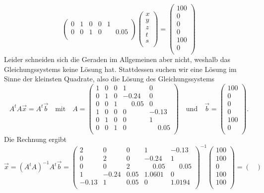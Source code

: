 \begin{loesung}
\[\begin{pmatrix}
0&1&0& 0 & 1\\
0&0&1& 0 & \phantom{-}0.05\\
\end{pmatrix}
\begin{pmatrix}
x\\y\\z\\ t\\s\\ 
\end{pmatrix}
= 
\begin{pmatrix}
100\\
0\\
0\\
0\\
100\\
0\\
\end{pmatrix}
\]
Leider schneiden sich die Geraden im Allgemeinen aber nicht,
weshalb das Gleichungssystems keine Lösung hat. Stattdessen
suchen wir eine Lösung im Sinne der kleinsten Quadrate, also die
Lösung des Gleichungssystems
\[
A^tA\vec x = A^t\vec b
\quad\text{mit}\quad 
A = \begin{pmatrix}
1&0&0& 1 & 0 \\
0&1&0&-0.24 & 0 \\
0&0&1& \phantom{-}0.05 & 0\\
1&0&0& 0 & -0.13\\
0&1&0& 0 & 1\\
0&0&1& 0 & \phantom{-}0.05\\
\end{pmatrix}
\quad\text{und}\quad
\vec b = \begin{pmatrix}
100\\
0\\
0\\
0\\
100\\
0\\
\end{pmatrix}.
\]
Die Rechnung ergibt 
\[
\vec x =  (A^tA)^{-1} A^t\vec b = 
\begin{pmatrix}
 2 & 0 & 0 & 1 & -0.13\\
 0 & 2 & 0 & -0.24 & 1\\
 0 & 0 & 2 & \phantom{-}0.05 & \phantom{-}0.05\\
 1 & -0.24 & 0.05 & 1.0601 & 0\\
 -0.13 & 1 & 0.05 & 0 & 1.0194\\
\end{pmatrix}^{-1}
\begin{pmatrix}
   100\\
   100\\
     0\\
   100\\
   100\\
\end{pmatrix}
=
\begin{pmatrix}
 

\end{pmatrix}\]
\end{loesung}
